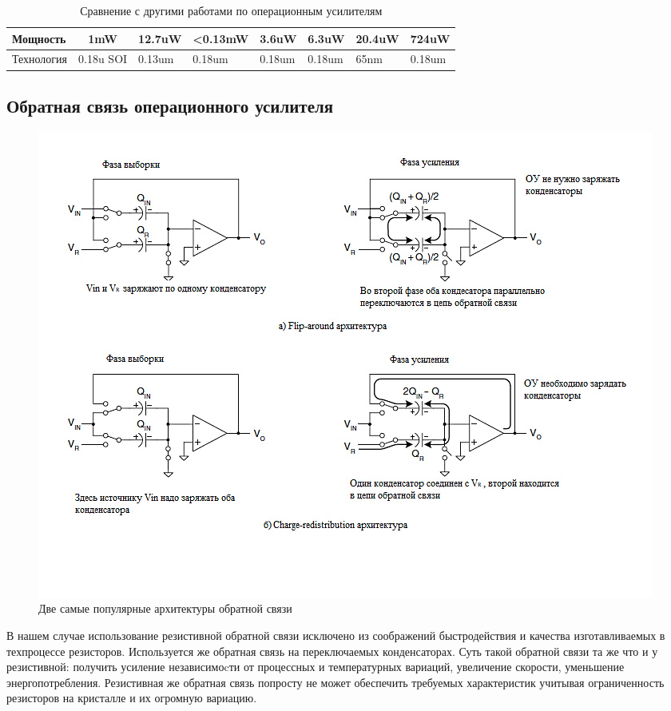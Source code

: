 \documentclass[a4paper,12pt]{article} %
\begin{document}
\begin{table}[h]
\begin{tabular}{|l|l|l|l|l|l|l|l|}
    Мощность                                                                                  & \multicolumn{1}{c|}{1mW} & 12.7uW                    & <0.13mW                  & 3.6uW                    & 6.3uW                  & 20.4uW                   & 724uW                  \\ \hline
    Технология                                                                                & 0.18u SOI                & 0.13um                    & 0.18um                   & 0.18um                   & 0.18um                 & 65nm                     & 0.18um                 \\ \hline
    \end{tabular}
    \caption{Сравнение с другими работами по операционным усилителям}
    \label{tab:op_amp_comp}
    \end{table}





\subsection{Обратная связь операционного усилителя}



\begin{figure}[H]
    \includegraphics[width=\textwidth]{Dve_arkhitektury.jpg}
    \caption{Две самые популярные архитектуры обратной связи}
    \label{pic:feedback}
\end{figure}



В нашем случае использование резистивной обратной связи исключено из соображений быстродействия и качества изготавливаемых в техпроцессе резисторов. Используется же обратная связь на переключаемых конденсаторах. 
Суть такой обратной связи та же что и у резистивной: получить усиление независимоcти от процессных  и температурных вариаций, увеличение скорости, уменьшение энергопотребления. Резистивная же обратная связь попросту не может обеспечить требуемых характеристик учитывая ограниченность резисторов на кристалле и их огромную вариацию. 
\end{document}
